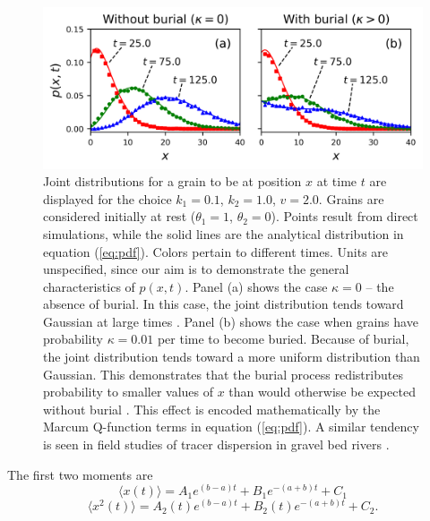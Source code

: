 \documentclass[]{agujournal2018}
\newcommand\be{\begin{equation}}
\newcommand\ee{\end{equation}}
\newcommand\bra{\langle}
\newcommand\ket{\rangle}
\begin{document}
\begin{figure}
	\includegraphics[width=\linewidth,keepaspectratio]{./figures/pdf-plot.png}
	\caption{Joint distributions for a grain to be at position $x$ at time $t$ are displayed for the choice $k_1=0.1$, $k_2=1.0$, $v=2.0$. Grains are considered initially at rest ($\theta_1=1$, $\theta_2=0$). Points result from direct simulations, while the solid lines are the analytical distribution in equation (\ref{eq:pdf}). Colors pertain to different times. Units are unspecified, since our aim is to demonstrate the general characteristics of $p(x,t)$. Panel (a) shows the case $\kappa=0$ -- the absence of burial.
	In this case, the joint distribution tends toward Gaussian at large times \citep[e.g.][]{Einstein1937,Lisle1998}. Panel (b) shows the case when grains have probability $\kappa = 0.01$ per time to become buried.
	Because of burial, the joint distribution tends toward a more uniform distribution than Gaussian. This demonstrates that the burial process redistributes probability to smaller values of $x$ than would otherwise be expected without burial \citep[c.f.][]{Wu2019}. This effect is encoded mathematically by the Marcum Q-function terms in equation  (\ref{eq:pdf}). A similar tendency is seen in field studies of tracer dispersion in gravel bed rivers \citep[e.g.][]{Hassan1994}.}
	\label{fig:pdfs}
\end{figure}
\noindent The first two moments are
\be \bra x(t) \ket = A_1 e^{(b-a)t}+B_1e^{-(a+b)t}+C_1 \label{eq:mean}\ee
\be \bra x^2(t) \ket = A_2(t)e^{(b-a)t}+B_2(t)e^{-(a+b)t}+C_2. \label{eq:second}\ee
\end{document}

